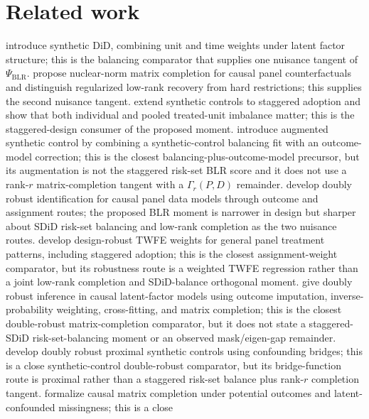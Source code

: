 \documentclass[11pt]{article}
\theoremstyle{definition}
\theoremstyle{plain}
\theoremstyle{remark}
\begin{document}
\section{Related work}
\citet{ArkhangelskyAtheyHirshbergImbensWager2021} introduce synthetic DiD,
combining unit and time weights under latent factor structure; this is the
balancing comparator that supplies one nuisance tangent of
$\Psi_{\mathrm{BLR}}$.
\citet{AtheyBayatiDoudchenkoImbensKhosravi2021} propose nuclear-norm matrix
completion for causal panel counterfactuals and distinguish regularized
low-rank recovery from hard restrictions; this supplies the second nuisance
tangent.
\citet{BenMichaelFellerRothstein2022} extend synthetic controls to staggered
adoption and show that both individual and pooled treated-unit imbalance
matter; this is the staggered-design consumer of the proposed moment.
\citet{BenMichaelFellerRothstein2021} introduce augmented synthetic control by
combining a synthetic-control balancing fit with an outcome-model correction;
this is the closest balancing-plus-outcome-model precursor, but its augmentation
is not the staggered risk-set BLR score and it does not use a rank-$r$
matrix-completion tangent with a $\Gamma_r(P,D)$ remainder.
\citet{ArkhangelskyImbens2022} develop doubly robust identification for causal
panel data models through outcome and assignment routes; the proposed BLR
moment is narrower in design but sharper about SDiD risk-set balancing and
low-rank completion as the two nuisance routes.
\citet{ArkhangelskyImbensLeiLuo2024} develop design-robust TWFE weights for
general panel treatment patterns, including staggered adoption; this is the
closest assignment-weight comparator, but its robustness route is a weighted
TWFE regression rather than a joint low-rank completion and SDiD-balance
orthogonal moment.
\citet{AbadieAgarwalDwivediShah2024} give doubly robust inference in causal
latent-factor models using outcome imputation, inverse-probability weighting,
cross-fitting, and matrix completion; this is the closest double-robust
matrix-completion comparator, but it does not state a staggered-SDiD
risk-set-balancing moment or an observed mask/eigen-gap remainder.
\citet{QiuShiMiaoDobribanTchetgenTchetgen2024} develop doubly robust proximal
synthetic controls using confounding bridges; this is a close synthetic-control
double-robust comparator, but its bridge-function route is proximal rather
than a staggered risk-set balance plus rank-$r$ completion tangent.
\citet{AgarwalDahlehShahShen2023} formalize causal matrix completion under
potential outcomes and latent-confounded missingness; this is a close
\end{document}

